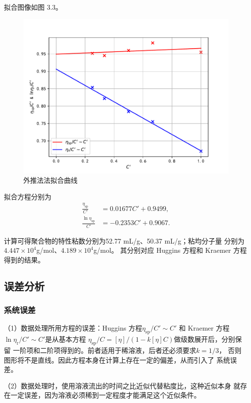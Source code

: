 \documentclass[12pt]{ctexart}
\numberwithin{equation}{section}
\begin{document}
拟合图像如图 3.3。
\begin{figure}[!h]
    \centering
    \includegraphics[scale=0.8]{fitting3.pdf}
    \caption{外推法法拟合曲线}
\end{figure}

拟合方程分别为
\begin{align}
    \frac{\eta_\text{sp}}{C'} &= 0.01677 C' + 0.9499, \\
    \frac{\ln\eta_\text{sp}}{C'} &= -0.2353 C' + 0.9067.
\end{align}

计算可得聚合物的特性粘数分别为52.77 mL/g、50.37 mL/g；粘均分子量
分别为$4.447\times 10^{4}$g/mol、$4.189\times 10^{4}$g/mol。
其分别对应 Huggins 方程和 Kraemer 方程得到的结果。

\subsection{误差分析}
\subsubsection{系统误差}

（1）数据处理所用方程的误差：Huggins 方程$\eta_{\text{sp}}/C'\sim C'$
和 Kraemer 方程$\ln\eta_\text{r}/C'\sim C'$是从基本方程
$\eta_\text{sp}/C = [\eta]/(1-k[\eta]C)$做级数展开后，分别保留
一阶项和二阶项得到的。前者适用于稀溶液，后者还必须要求$k = 1/3$，
否则图形将不是直线。因此方程本身在计算上存在一定的偏差，从而引入了
系统误差。

（2）数据处理时，使用溶液流出的时间之比近似代替粘度比，这种近似本身
就存在一定误差，因为溶液必须稀到一定程度才能满足这个近似条件。
\end{document}
